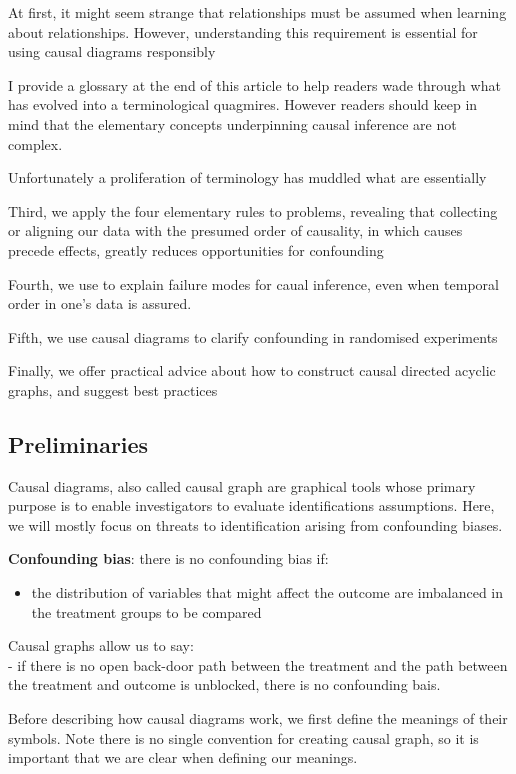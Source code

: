 \documentclass[
  single column]{article}
\providecommand{\tightlist}{%
  \setlength{\itemsep}{0pt}\setlength{\parskip}{0pt}}\usepackage{longtable,booktabs,array}
\begin{document}
At first, it might seem strange that relationships must be assumed when
learning about relationships. However, understanding this requirement is
essential for using causal diagrams responsibly

I provide a glossary at the end of this article to help readers wade
through what has evolved into a terminological quagmires. However
readers should keep in mind that the elementary concepts underpinning
causal inference are not complex.

Unfortunately a proliferation of terminology has muddled what are
essentially

Third, we apply the four elementary rules to problems, revealing that
collecting or aligning our data with the presumed order of causality, in
which causes precede effects, greatly reduces opportunities for
confounding

Fourth, we use to explain failure modes for caual inference, even when
temporal order in one's data is assured.

Fifth, we use causal diagrams to clarify confounding in randomised
experiments

Finally, we offer practical advice about how to construct causal
directed acyclic graphs, and suggest best practices

\subsection{Preliminaries}\label{preliminaries}

Causal diagrams, also called causal graph are graphical tools whose
primary purpose is to enable investigators to evaluate identifications
assumptions. Here, we will mostly focus on threats to identification
arising from confounding biases.

\textbf{Confounding bias}: there is no confounding bias if:

\begin{itemize}
\tightlist
\item
  the distribution of variables that might affect the outcome are
  imbalanced in the treatment groups to be compared
\end{itemize}

Causal graphs allow us to say:\\
- if there is no open back-door path between the treatment and the path
between the treatment and outcome is unblocked, there is no confounding
bais.

Before describing how causal diagrams work, we first define the meanings
of their symbols. Note there is no single convention for creating causal
graph, so it is important that we are clear when defining our meanings.
\end{document}
